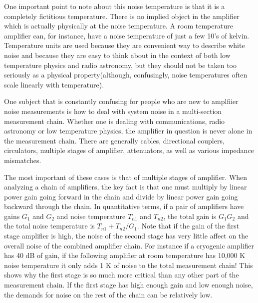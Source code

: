 \documentclass[11pt]{article}
\begin{document}
	One important point to note about this noise temperature is that it is a completely fictitious temperature.  There is no implied object in the amplifier which is actually physically at the noise temperature.  A room temperature amplifier can, for instance, have a noise temperature of just a few 10's of kelvin.  Temperature units are used because they are convenient way to describe white noise and because they are easy to think about in the context of both low temperature physics and radio astronomy, but they should not be taken too seriously as a physical property(although, confusingly, noise temperatures often scale linearly with temperature).  




    	One subject that is constantly confusing for people who are new to amplfiier noise measurements is how to deal with system noise in a multi-section measurement chain.  Whether one is dealing with communications, radio astronomy or low temperature physics, the amplifier in question is never alone in the measurement chain.  There are generally cables, directional couplers, circulators, multiple stages of amplifier, attenuators, as well as various impedance mismatches.  




    	The most important of these cases is that of multiple stages of amplifier.  When analyzing a chain of amplifiers, the key fact is that one must multiply by linear power gain going forward in the chain and divide by linear power gain going backward through the chain.  In quantitative terms, if a pair of amplifiers have gains $G_1$ and $G_2$ and noise temperature $T_{n1}$ and $T_{n2}$, the total gain is $G_1G_2$ and the total noise temperature is $T_{n1} + T_{n2}/G_1$.  Note that if the gain of the first stage amplifier is high, the noise of the second stage has very little affect on the overall noise of the combined amplifier chain.  For instance if a cryogenic amplifier has 40 dB of gain, if the following amplifier at room temperature has 10,000 K noise temperature it only adds 1 K of noise to the total measurement chain!  This shows why the first stage is so much more critical than any other part of the measurement chain.  If the first stage has high enough gain and low enough noise, the demands for noise on the rest of the chain can be relatively low.  
\end{document}

